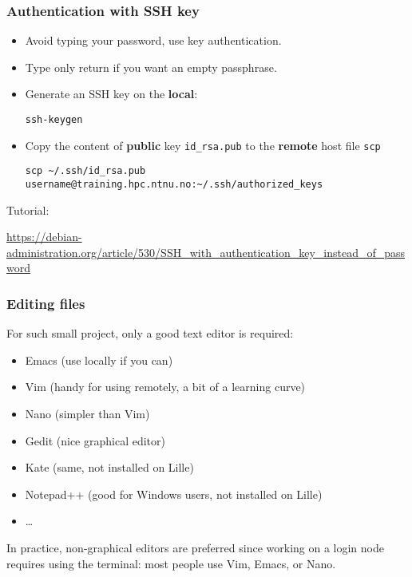 \begin{frame}[fragile]
  \frametitle{Authentication with SSH key}
  \begin{itemize}
  \item Avoid typing your password, use key authentication.
  \item Type only return if you want an empty passphrase.
  \item Generate an SSH key on the \textbf{local}:
\begin{lstlisting}[style=shell]
ssh-keygen
\end{lstlisting}
  \item Copy the content of \textbf{public} key \texttt{id\_rsa.pub} to the \textbf{remote} host file \texttt{scp}
\tiny{
\begin{lstlisting}[style=shell]
 scp ~/.ssh/id_rsa.pub username@training.hpc.ntnu.no:~/.ssh/authorized_keys
\end{lstlisting}
}
  \end{itemize}

\bigskip
Tutorial:

\medskip
\small{
\url{https://debian-administration.org/article/530/SSH_with_authentication_key_instead_of_password}
}
\end{frame}

\begin{frame}
  \frametitle{Editing files}

For such small project, only a good text editor is required:
  \begin{itemize}
  \item Emacs (use locally if you can)
  \item Vim (handy for using remotely, a bit of a learning curve)
  \item Nano (simpler than Vim)
  \item Gedit (nice graphical editor)
  \item Kate (same, not installed on Lille)
  \item Notepad++ (good for Windows users, not installed on Lille)
  \item \ldots
  \end{itemize}

\medskip
In practice, non-graphical editors are preferred since working on a login node requires using the terminal: most people use Vim, Emacs, or Nano.

\end{frame}


